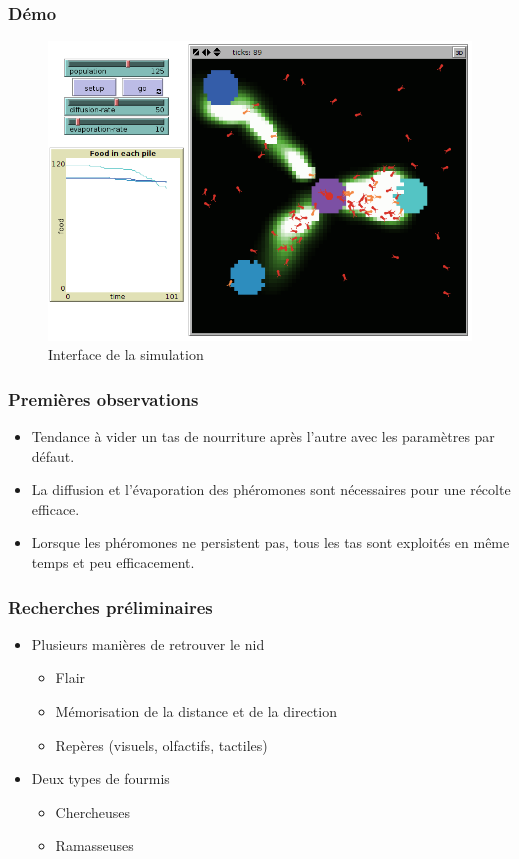 \documentclass[11pt]{beamer}
\begin{document}
\begin{frame}
\frametitle{Démo}
\begin{figure}
\includegraphics[scale=0.3]{Capture2.png}
\caption{Interface de la simulation}
\end{figure}
\end{frame}

\begin{frame}
\frametitle{Premières observations}
\begin{itemize}
\item Tendance à vider un tas de nourriture après l'autre avec les paramètres par défaut.
\item La diffusion et l'évaporation des phéromones sont nécessaires pour une récolte efficace.
\item Lorsque les phéromones ne persistent pas, tous les tas sont exploités en même temps et peu efficacement.
\end{itemize}
\end{frame}

\begin{frame}
\frametitle{Recherches préliminaires}
\begin{itemize}
\item Plusieurs manières de retrouver le nid
\begin{itemize}
\item Flair
\item Mémorisation de la distance et de la direction
\item Repères (visuels, olfactifs, tactiles)
\end{itemize}
\item Deux types de fourmis
\begin{itemize}
\item Chercheuses
\item Ramasseuses
\end{itemize}
\end{itemize}
\end{frame}
\end{document}
